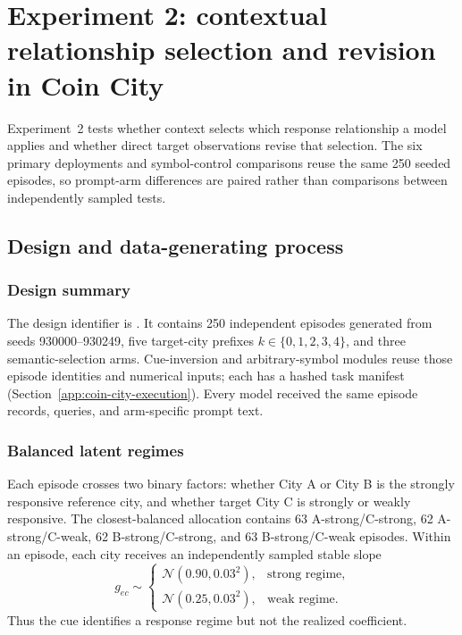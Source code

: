 \section{Experiment 2: contextual relationship selection and revision in Coin City}
\label{app:coin-city}

Experiment~2 tests whether context
selects which response relationship a model applies and whether direct target
observations revise that selection. The six primary deployments and symbol-control
comparisons reuse the same 250 seeded episodes, so prompt-arm differences are
paired rather than comparisons between independently sampled tests.

\subsection{Design and data-generating process}
\label{app:coin-city-design}

\subsubsection{Design summary}
The design identifier is
. It contains 250 independent
episodes generated from seeds 930000--930249, five target-city prefixes
\(k\in\{0,1,2,3,4\}\), and three semantic-selection arms. Cue-inversion and
arbitrary-symbol modules reuse those episode identities and numerical inputs; each
has a hashed task manifest (Section~\ref{app:coin-city-execution}). Every model received the same
episode records, queries, and arm-specific prompt text.

\subsubsection{Balanced latent regimes}
Each episode crosses two binary factors: whether City A or City B is the strongly
responsive reference city, and whether target City C is strongly or weakly
responsive. The closest-balanced allocation contains 63 A-strong/C-strong,
62 A-strong/C-weak, 62 B-strong/C-strong, and 63 B-strong/C-weak episodes.
Within an episode, each city receives an independently sampled stable slope
\[
  g_{ec}\sim
  \begin{cases}
    \mathcal N(0.90,0.03^2), & \text{strong regime},\\
    \mathcal N(0.25,0.03^2), & \text{weak regime}.
  \end{cases}
\]
Thus the cue identifies a response regime but not the realized coefficient.

